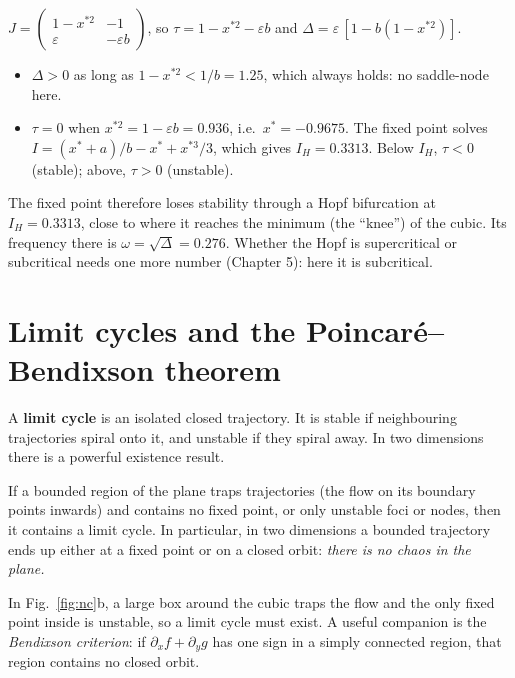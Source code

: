 \documentclass[11pt,openany]{report}
\newcommand{\eps}{\varepsilon}
\begin{document}
\begin{worked}
$J = \begin{pmatrix} 1 - x^{*2} & -1\\ \eps & -\eps b\end{pmatrix}$, so
$\tau = 1 - x^{*2} - \eps b$ and $\Delta = \eps\,[1 - b(1 - x^{*2})]$.
\begin{itemize}
\item $\Delta>0$ as long as $1 - x^{*2} < 1/b = 1.25$, which always holds: no saddle-node here.
\item $\tau = 0$ when $x^{*2} = 1 - \eps b = 0.936$, i.e.\ $x^* = -0.9675$. The fixed point solves
$I = (x^*+a)/b - x^* + x^{*3}/3$, which gives $I_H = 0.3313$. Below $I_H$, $\tau<0$ (stable); above, $\tau>0$ (unstable).
\end{itemize}
The fixed point therefore loses stability through a Hopf bifurcation at $I_H = 0.3313$, close to where it reaches the
minimum (the ``knee'') of the cubic. Its frequency there is $\omega = \sqrt\Delta = 0.276$. Whether the Hopf is
supercritical or subcritical needs one more number (Chapter 5): here it is subcritical.
\end{worked}

\section{Limit cycles and the Poincaré--Bendixson theorem}\label{sec:pb}
A \textbf{limit cycle} is an isolated closed trajectory. It is stable if neighbouring trajectories spiral onto it, and
unstable if they spiral away. In two dimensions there is a powerful existence result.

\begin{keyidea}
If a bounded region of the plane traps trajectories (the flow on its boundary points inwards) and contains no fixed
point, or only unstable foci or nodes, then it contains a limit cycle. In particular, in two dimensions a bounded
trajectory ends up either at a fixed point or on a closed orbit: \emph{there is no chaos in the plane.}
\end{keyidea}
In Fig.~\ref{fig:nc}b, a large box around the cubic traps the flow and the only fixed point inside is unstable, so a
limit cycle must exist. A useful companion is the \emph{Bendixson criterion}: if $\partial_x f + \partial_y g$ has one
sign in a simply connected region, that region contains no closed orbit.

\end{document}
